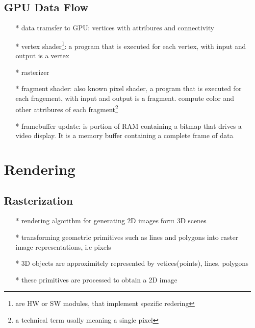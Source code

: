 \documentclass[12pt, a4paper]{article}
\begin{document}
\subsection{GPU Data Flow}
\begin{itemize}
  \item[*] data tramsfer to GPU: vertices with attribures and connectivity
  \item[*] vertex shader\footnote{are HW or SW modules, that implement spezific redering}: a program that is executed for each vertex, with input and output is a vertex
  \item[*] rasterizer
  \item[*] fragment shader: also known pixel shader, a program that is executed for each fragement, with input and output is a fragment. compute color and other attribures of each fragment\footnote{
  a technical term usally meaning a single pixel }
  \item[*] framebuffer update: is portion of RAM containing a bitmap that drives a video display. It is a memory buffer containing a complete frame of data
\end{itemize}

\section{Rendering}
\subsection{Rasterization}
\begin{itemize}
  \item[*] rendering algorithm for generating 2D images form 3D scenes
  \item[*] transforming geometric primitives such as lines and polygons into raster image representations, i.e pixels
  \item[*] 3D objects are approximitely represented by vetices(points), lines, polygons
  \item[*] these primitives are processed to obtain a 2D image
\end{itemize}
\end{document}
